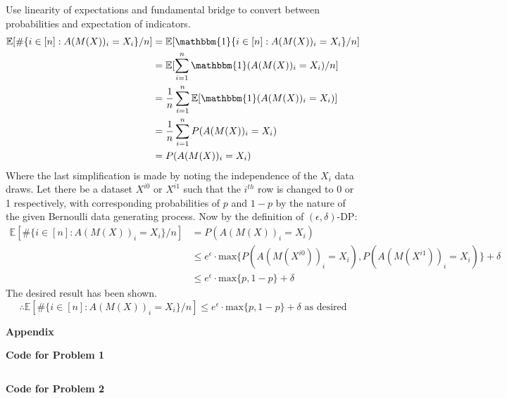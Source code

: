 \documentclass[12pt]{article}
\begin{document}
Use linearity of expectations and fundamental bridge to convert between probabilities and expectation of indicators.
\begin{align*}
	\mathbb{E}[\#\{ i\in [n]: A(M(X))_i = X_i\} / n] &= \mathbb{E}[\mathbbm{1}\{ i\in [n]: A(M(X))_i = X_i\} / n]\\
	&= \mathbb{E}[\sum\limits^n_{i=1}\mathbbm{1}(A(M(X))_i = X_i) / n]\\
	&= \dfrac{1}{n}\sum\limits^n_{i=1}\mathbb{E}[\mathbbm{1}(A(M(X))_i = X_i)]\\
	&= \dfrac{1}{n}\sum\limits^n_{i=1}P(A(M(X))_i = X_i)\\
	&= P(A(M(X))_i = X_i)
\end{align*}
Where the last simplification is made by noting the independence of the $X_i$ data draws. Let there be a dataset $X^{i0}$ or $X^{i1}$ such that the $i^{th}$ row is changed to 0 or 1 respectively, with corresponding probabilities of $p$ and $1-p$ by the nature of the given Bernoulli data generating process. Now by the definition of $(\epsilon, \delta)$-DP:
\begin{align*}
	\mathbb{E}[\#\{ i\in [n]: A(M(X))_i = X_i\} / n] &= P(A(M(X))_i = X_i)\\
	&\leq e^{\epsilon}\cdot \text{max}\{P(A(M(X^{i0}))_i = X_i),P(A(M(X^{i1}))_i = X_i)\} + \delta\\
	&\leq e^{\epsilon}\cdot \text{max}\{p, 1-p\} + \delta
\end{align*}
The desired result has been shown.
\[\therefore\boxed{\mathbb{E}[\#\{ i\in [n]: A(M(X))_i = X_i\} / n] \leq e^{\epsilon} \cdot \text{max}\{p, 1-p\} + \delta}\text{ as desired}\]



\pagebreak

{\large\textbf{Appendix}}

\textbf{Code for Problem 1}

\begin{lstlisting}[language=R]
\end{lstlisting}

\pagebreak

\textbf{Code for Problem 2}
\end{document}
